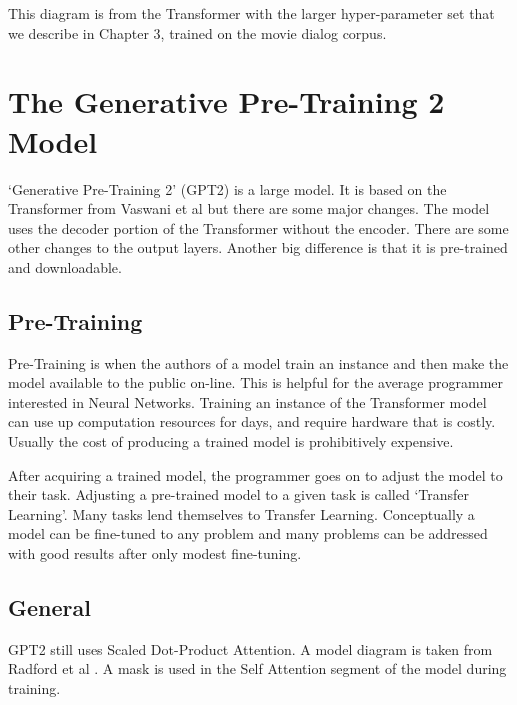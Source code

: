 This diagram is from the Transformer with the larger hyper-parameter set that we describe in Chapter 3, trained on the movie dialog corpus.


\section{The Generative Pre-Training 2 Model}

`Generative Pre-Training 2' (\ac{GPT2}) is a large model. It is based on the Transformer from Vaswani et al \cite{Vaswani2017AttentionIA} but there are some major changes. The model uses the decoder portion of the Transformer without the encoder. There are some other changes to the output layers. Another big difference is that it is pre-trained and downloadable.

\subsection{Pre-Training}
Pre-Training is when the authors of a model train an instance and then make the model available to the public on-line. This is helpful for the average programmer interested in Neural Networks. Training an instance of the Transformer model can use up computation resources for days, and require hardware that is costly. Usually the cost of producing a trained model is prohibitively expensive.

After acquiring a trained model, the programmer goes on to adjust the model to their task. Adjusting a pre-trained model to a given task is called `Transfer Learning'. Many tasks lend themselves to Transfer Learning. Conceptually a model can be fine-tuned to any problem and many problems can be addressed with good results after only modest fine-tuning.


\subsection{General}
GPT2 still uses Scaled Dot-Product Attention. A model diagram is taken from Radford et al \cite{radford2018improving}. A mask is used in the Self Attention segment of the model during training.


